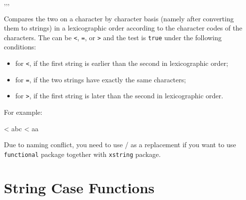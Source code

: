 \documentclass[oneside]{book}
\begin{document}
\begin{function}{\StrCompare,\StrCompareT,\StrCompareF,\StrCompareTF}
\begin{syntax}
   
    
    
     
\end{syntax}
Compares the two  on a character by character
basis (namely after converting them to strings) in a lexicographic
order according to the character codes of the characters.  The
 can be \verb|<|, \verb|=|, or \verb|>| and the test is
\texttt{true} under the following conditions:
\begin{itemize}[nosep]
\item for \verb|<|, if the first string is earlier than the second in lexicographic order;
\item for \verb|=|, if the two strings have exactly the same characters;
\item for \verb|>|, if the first string is later than the second in lexicographic order.
\end{itemize}
For example:
\begin{demohigh}
 < {abc} {} {}
 < {aa} {} {}
\end{demohigh}
\par
Due to naming conflict, you need to use / as a replacement
if you want to use \verb!functional! package together with \verb!xstring! package.
\end{function}

\section{String Case Functions}
\end{document}
